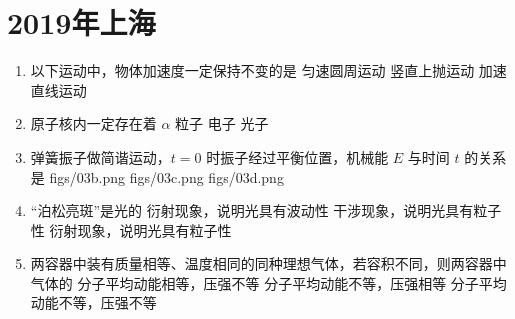 \documentclass[\gkver]{gaokaozhenti}
\begin{document}
\chapter{2019年上海}

\begin{enumerate}
\item
以下运动中，物体加速度一定保持不变的是
{匀速圆周运动}
{竖直上抛运动}
{加速直线运动}

\item
原子核内一定存在着
{$\alpha$ 粒子}
{电子}
{光子}

\item
弹簧振子做简谐运动，$t = 0$ 时振子经过平衡位置，机械能 $E$ 与时间 $t$ 的关系是
{figs/03b.png}
{figs/03c.png}
{figs/03d.png}

\item
“泊松亮斑”是光的
{衍射现象，说明光具有波动性}
{干涉现象，说明光具有粒子性}
{衍射现象，说明光具有粒子性}

\item
两容器中装有质量相等、温度相同的同种理想气体，若容积不同，则两容器中气体的
{分子平均动能相等，压强不等}
{分子平均动能不等，压强相等}
{分子平均动能不等，压强不等}


\end{enumerate}
\end{document}
